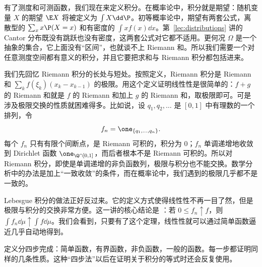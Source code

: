 \label{lec:integration}

有了测度和可测函数，我们现在来定义积分。在概率论中，积分就是期望：随机变量 $X$ 的期望 $\E X$ 将被定义为 $\int X\dd\P$。初等概率论中，期望有两套公式，离散型的 $\sum_xx\P(X=x)$ 和有密度的 $\int xf(x)\dd x$。第~\ref{lec:distributions} 讲的 Cantor 分布既没有跳跃也没有密度，这两套公式对它都不适用。更何况 $\Omega$ 是一个抽象的集合，它上面没有“区间”，也就谈不上 Riemann 和。所以我们需要一个对任意测度空间都有意义的积分，并且它要把求和与 Riemann 积分都包括进来。

我们先回忆 Riemann 积分的长处与短处。按照定义，Riemann 积分是 Riemann 和 $\sum_kf(\xi_k)(x_k-x_{k-1})$ 的极限。用这个定义证明线性性是很简单的：$f+g$ 的 Riemann 和就是 $f$ 的 Riemann 和加上 $g$ 的 Riemann 和，取极限即可。可是涉及极限交换的性质就困难得多。比如说，设 $q_1,q_2,\dots$ 是 $[0,1]$ 中有理数的一个排列，令
\[
f_n=\one_{\{q_1,\dots,q_n\}}.
\]
每个 $f_n$ 只有有限个间断点，是 Riemann 可积的，积分为 $0$；$f_n$ 单调递增地收敛到 Dirichlet 函数 $\one_{\Q\cap[0,1]}$，而后者根本不是 Riemann 可积的。所以对 Riemann 积分，即使是单调递增的非负函数列，极限与积分也不能交换。数学分析中的办法是加上“一致收敛”的条件，而在概率论中，我们遇到的极限几乎都不是一致的。

Lebesgue 积分的做法正好反过来。它的定义方式使得线性性不再一目了然，但是极限与积分的交换非常方便。这一讲的核心结论是 ：若 $0\leqslant f_n\uparrow f$，则 $\int f_n\dd\mu\uparrow\int f\dd\mu$。我们会看到，只要有了这个定理，线性性就可以通过简单函数逼近几乎自动地得到。

定义分四步完成：简单函数，有界函数，非负函数，一般的函数。每一步都证明同样的几条性质。这种“四步法”以后在证明关于积分的等式时还会反复使用。


